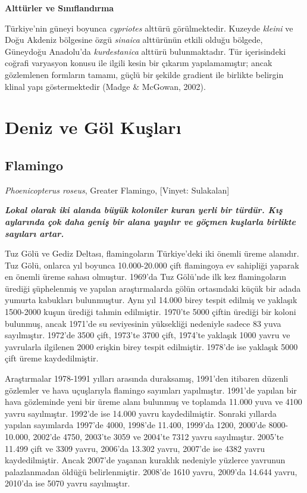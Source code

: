 \documentclass[
  a4paper,
  DIV=11,
  numbers=noendperiod]{scrreprt}
\begin{document}
\textbf{Alttürler ve Sınıflandırma}

Türkiye'nin güneyi boyunca \emph{cypriotes} alttürü görülmektedir.
Kuzeyde \emph{kleini} ve Doğu Akdeniz bölgesine özgü \emph{sinaica}
alttürünün etkili olduğu bölgede, Güneydoğu Anadolu'da
\emph{kurdestanica} alttürü bulunmaktadır. Tür içerisindeki coğrafi
varyasyon konusu ile ilgili kesin bir çıkarım yapılamamıştır; ancak
gözlemlenen formların tamamı, güçlü bir şekilde gradient ile birlikte
belirgin klinal yapı göstermektedir (Madge \& McGowan, 2002).


\chapter{Deniz ve Göl Kuşları}\label{deniz-ve-guxf6l-kuux15flarux131}

\section{Flamingo}\label{flamingo}

\emph{Phoenicopterus roseus}, Greater Flamingo, {[}Vinyet: Sulakalan{]}

\textbf{\emph{Lokal olarak iki alanda büyük koloniler kuran yerli bir
türdür. Kış aylarında çok daha geniş bir alana yayılır ve göçmen
kuşlarla birlikte sayıları artar.}}

Tuz Gölü ve Gediz Deltası, flamingoların Türkiye'deki iki önemli üreme
alanıdır. Tuz Gölü, onlarca yıl boyunca 10.000-20.000 çift flamingoya ev
sahipliği yaparak en önemli üreme sahası olmuştur. 1969'da Tuz Gölü'nde
ilk kez flamingoların ürediği şüphelenmiş ve yapılan araştırmalarda
gölün ortasındaki küçük bir adada yumurta kabukları bulunmuştur. Aynı
yıl 14.000 birey tespit edilmiş ve yaklaşık 1500-2000 kuşun ürediği
tahmin edilmiştir. 1970'te 5000 çiftin ürediği bir koloni bulunmuş,
ancak 1971'de su seviyesinin yüksekliği nedeniyle sadece 83 yuva
sayılmıştır. 1972'de 3500 çift, 1973'te 3700 çift, 1974'te yaklaşık 1000
yavru ve yavrularla ilgilenen 2000 erişkin birey tespit edilmiştir.
1978'de ise yaklaşık 5000 çift üreme kaydedilmiştir.

Araştırmalar 1978-1991 yılları arasında duraksamış, 1991'den itibaren
düzenli gözlemler ve hava uçuşlarıyla flamingo sayımları yapılmıştır.
1991'de yapılan bir hava gözleminde yeni bir üreme alanı bulunmuş ve
toplamda 11.000 yuva ve 4100 yavru sayılmıştır. 1992'de ise 14.000 yavru
kaydedilmiştir. Sonraki yıllarda yapılan sayımlarda 1997'de 4000,
1998'de 11.400, 1999'da 1200, 2000'de 8000-10.000, 2002'de 4750, 2003'te
3059 ve 2004'te 7312 yavru sayılmıştır. 2005'te 11.499 çift ve 3309
yavru, 2006'da 13.302 yavru, 2007'de ise 4382 yavru kaydedilmiştir.
Ancak 2007'de yaşanan kuraklık nedeniyle yüzlerce yavrunun palazlanmadan
öldüğü belirlenmiştir. 2008'de 1610 yavru, 2009'da 14.644 yavru, 2010'da
ise 5070 yavru sayılmıştır.
\end{document}
